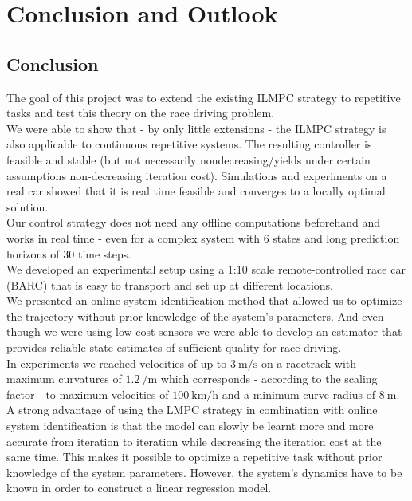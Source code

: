 \chapter{Conclusion and Outlook}

\section{Conclusion}
The goal of this project was to extend the existing ILMPC strategy to repetitive tasks and test this theory on the race driving problem.\\
We were able to show that - by only little extensions - the ILMPC strategy is also applicable to continuous repetitive systems. The resulting controller is feasible and stable (but not necessarily nondecreasing/yields under certain assumptions non-decreasing iteration cost). Simulations and experiments on a real car showed that it is real time feasible and converges to a locally optimal solution.\\
Our control strategy does not need any offline computations beforehand and works in real time - even for a complex system with 6 states and long prediction horizons of 30 time steps.\\
We developed an experimental setup using a 1:10 scale remote-controlled race car (BARC) that is easy to transport and set up at different locations.\\
We presented an online system identification method that allowed us to optimize the trajectory without prior knowledge of the system's parameters. And even though we were using low-cost sensors we were able to develop an estimator that provides reliable state estimates of sufficient quality for race driving.\\
In experiments we reached velocities of up to $\SI{3}{\meter\per\second}$ on a racetrack with maximum curvatures of $\SI{1.2}{\per\meter}$ which corresponds - according to the scaling factor - to maximum velocities of $\SI{100}{\kilo\meter\per\hour}$ and a minimum curve radius of $\SI{8}{\meter}$.\\
A strong advantage of using the LMPC strategy in combination with online system identification is that the model can slowly be learnt more and more accurate from iteration to iteration while decreasing the iteration cost at the same time. This makes it possible to optimize a repetitive task without prior knowledge of the system parameters. However, the system's dynamics have to be known in order to construct a linear regression model.
